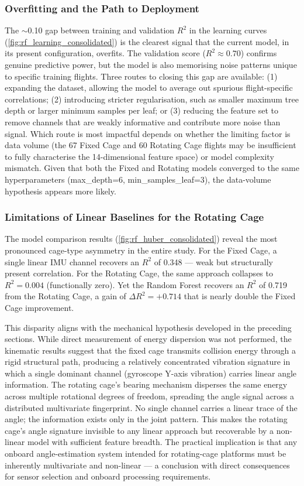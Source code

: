 \subsubsection{Overfitting and the Path to Deployment}

The $\sim$0.10 gap between training and validation $R^2$ in the learning curves (\autoref{fig:rf_learning_consolidated}) is the clearest signal that the current model, in its present configuration, overfits. The validation score ($R^2 \approx 0.70$) confirms genuine predictive power, but the model is also memorising noise patterns unique to specific training flights. Three routes to closing this gap are available: (1) expanding the dataset, allowing the model to average out spurious flight-specific correlations; (2) introducing stricter regularisation, such as smaller maximum tree depth or larger minimum samples per leaf; or (3) reducing the feature set to remove channels that are weakly informative and contribute more noise than signal. Which route is most impactful depends on whether the limiting factor is data volume (the 67 Fixed Cage and 60 Rotating Cage flights may be insufficient to fully characterise the 14-dimensional feature space) or model complexity mismatch. Given that both the Fixed and Rotating models converged to the same hyperparameters (max\_depth=6, min\_samples\_leaf=3), the data-volume hypothesis appears more likely.

\subsubsection{Limitations of Linear Baselines for the Rotating Cage}

The model comparison results (\autoref{fig:rf_huber_consolidated}) reveal the most pronounced cage-type asymmetry in the entire study. For the Fixed Cage, a single linear IMU channel recovers an $R^2$ of 0.348 --- weak but structurally present correlation. For the Rotating Cage, the same approach collapses to $R^2 = 0.004$ (functionally zero). Yet the Random Forest recovers an $R^2$ of 0.719 from the Rotating Cage, a gain of $\Delta R^2 = +0.714$ that is nearly double the Fixed Cage improvement.

This disparity aligns with the mechanical hypothesis developed in the preceding sections. While direct measurement of energy dispersion was not performed, the kinematic results suggest that the fixed cage transmits collision energy through a rigid structural path, producing a relatively concentrated vibration signature in which a single dominant channel (gyroscope Y-axis vibration) carries linear angle information. The rotating cage's bearing mechanism disperses the same energy across multiple rotational degrees of freedom, spreading the angle signal across a distributed multivariate fingerprint. No single channel carries a linear trace of the angle; the information exists only in the joint pattern. This makes the rotating cage's angle signature invisible to any linear approach but recoverable by a non-linear model with sufficient feature breadth. The practical implication is that any onboard angle-estimation system intended for rotating-cage platforms must be inherently multivariate and non-linear --- a conclusion with direct consequences for sensor selection and onboard processing requirements.
\endinput
